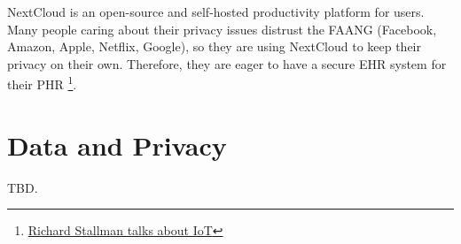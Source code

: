 NextCloud is an open-source and self-hosted productivity platform for users.
Many people caring about their privacy issues distrust the FAANG (Facebook,
Amazon, Apple, Netflix, Google), so they are using NextCloud to keep their privacy
on their own. Therefore, they are eager to have a secure EHR system for their
PHR
\footnote{\href{https://www.youtube.com/watch?v=AAP4N3KyLmM}{Richard Stallman talks about IoT}}.

\section{Data and Privacy}
TBD.
